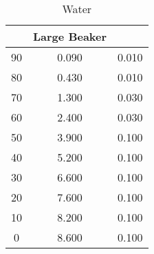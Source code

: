 \begin{table}[H]
\begin{center}
{\begin{tabular}{ccc}
			\hline
			& Large Beaker & \\
			\hline
			90 & 0.090 & 0.010 \\
			80 & 0.430 & 0.010 \\
			70 & 1.300 & 0.030 \\
			60 & 2.400 & 0.030 \\
			50 & 3.900 & 0.100 \\
			40 & 5.200 & 0.100 \\
			30 & 6.600 & 0.100 \\
			20 & 7.600 & 0.100 \\
			10 & 8.200 & 0.100 \\
			0 & 8.600 & 0.100 \\
			\bottomrule
		\end{tabular}}
	\end{center}
	\caption{Water}
	\label{tab:water}
\end{table}

